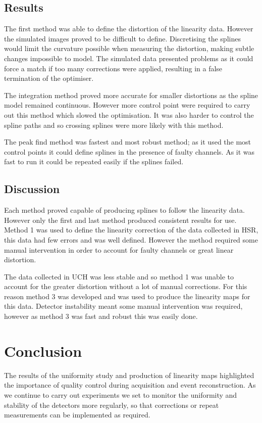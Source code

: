 \subsection{Results}
The first method was able to define the distortion of the linearity data. However the simulated images proved to be difficult to define. Discretising the splines would limit the curvature possible when measuring the distortion, making subtle changes impossible to model. The simulated data presented problems as it could force a match if too many corrections were applied, resulting in a false termination of the optimiser.

The integration method proved more accurate for smaller distortions as the spline model remained continuous. However more control point were required to carry out this method which slowed the optimisation. It was also harder to control the spline paths and so crossing splines were more likely with this method. 

The peak find method was fastest and most robust method; as it used the most control points it could define splines in the presence of faulty channels. As it was fast to run it could be repeated easily if the splines failed. 
\subsection{Discussion}
Each method proved capable of producing splines to follow the linearity data. However only the first and last method produced consistent results for use. Method 1 was used to define the linearity correction of the data collected in \acrshort{HSR}, this data had few errors and was well defined. However the method required some manual intervention in order to account for faulty channels or great linear distortion. 

The data collected in \acrshort{UCH} was less stable and so method 1 was unable to account for the greater distortion without a lot of manual corrections. For this reason method 3 was developed and was used to produce the linearity maps for this data. Detector instability meant some manual intervention was required, however as method 3 was fast and robust this was easily done. 
\section{Conclusion}
The results of the uniformity study and production of linearity maps highlighted the importance of quality control during acquisition and event reconstruction. As we continue to carry out experiments we set to monitor the uniformity and stability of the detectors more regularly, so that corrections or repeat measurements can be implemented as required.

